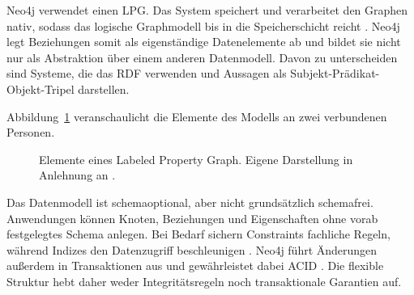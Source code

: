 Neo4j verwendet einen \ac{LPG}. Das System speichert und verarbeitet den Graphen nativ, sodass das logische Graphmodell bis in die Speicherschicht reicht \cite{neo4j2026overview}. Neo4j legt Beziehungen somit als eigenständige Datenelemente ab und bildet sie nicht nur als Abstraktion über einem anderen Datenmodell. Davon zu unterscheiden sind Systeme, die das \ac{RDF} verwenden und Aussagen als Subjekt-Prädikat-Objekt-Tripel darstellen.

Abbildung~\ref{fig:lpg-model} veranschaulicht die Elemente des Modells an zwei verbundenen Personen.

\begin{figure}[htbp]
	\centering
	\caption{Elemente eines Labeled Property Graph. Eigene Darstellung in Anlehnung an \cite{angles2017foundations,neo4j2026concepts}.}
	\label{fig:lpg-model}
\end{figure}

Das Datenmodell ist schemaoptional, aber nicht grundsätzlich schemafrei. Anwendungen können Knoten, Beziehungen und Eigenschaften ohne vorab festgelegtes Schema anlegen. Bei Bedarf sichern Constraints fachliche Regeln, während Indizes den Datenzugriff beschleunigen \cite{neo4j2026concepts}. Neo4j führt Änderungen außerdem in Transaktionen aus und gewährleistet dabei \ac{ACID} \cite{neo4j2026overview}. Die flexible Struktur hebt daher weder Integritätsregeln noch transaktionale Garantien auf.

